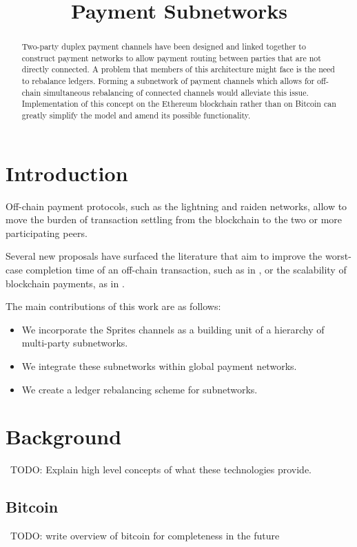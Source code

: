 \documentclass[12pt]{article}
\title{Payment Subnetworks\vspace{-4.5em}}
\date{}
\author{}
\newcommand{\todo}[1]{{\color{red}\ TODO: {#1}}}
\begin{document}
\maketitle
\begin{abstract}
Two-party duplex payment channels have been designed and linked together to construct payment networks to allow payment routing between parties that are not directly connected. A problem that members of this architecture might face is the need to rebalance ledgers. Forming a subnetwork of payment channels which allows for off-chain simultaneous rebalancing of connected channels would alleviate this issue. Implementation of this concept on the Ethereum blockchain rather than on Bitcoin can greatly simplify the model and amend its possible functionality.
\end{abstract}

\section{Introduction}
Off-chain payment protocols, such as the lightning \cite{lightning} and raiden \cite{raiden} networks, allow to move the burden of transaction settling from the blockchain to the two or more participating peers. 

Several new proposals have surfaced the literature that aim to improve the worst-case completion time of an off-chain transaction, such as in \cite{sprites}, or the scalability of blockchain payments, as in \cite{scale}.

The main contributions of this work are as follows:\vspace{-0.9em}
\begin{itemize}
	\item We incorporate the Sprites channels as a building unit of a hierarchy of multi-party subnetworks.
	\item We integrate these subnetworks within global payment networks.
	\item We create a ledger rebalancing scheme for subnetworks.
\end{itemize}

\section{Background}
\todo{Explain high level concepts of what these technologies provide.}

\subsection{Bitcoin}
\todo{write overview of bitcoin for completeness in the future} \cite{bitcoin}
\end{document}
